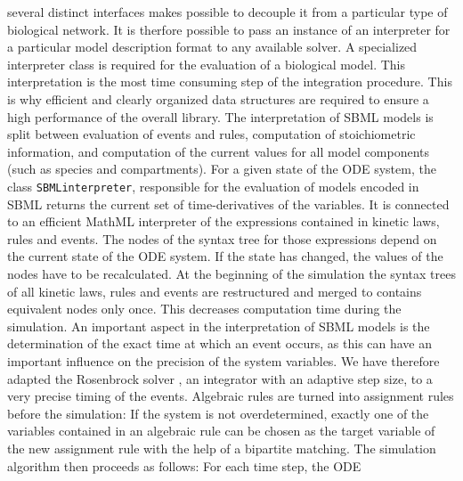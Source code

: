 \documentclass{bioinfo}
\newcommand{\SBMLinterpreter}{\texttt{SBML\-interpreter}}
\begin{document}
\begin{methods}
several distinct interfaces makes possible to decouple it from a particular type
of biological network. It is therfore possible to pass an instance of an
interpreter for a particular model description format to any
available solver.
%
A specialized interpreter class is required for the evaluation of a biological
model. This interpretation is the most time consuming step of the integration procedure.
This is why efficient and clearly organized data structures are required to
ensure a high performance of the overall library. The interpretation of SBML
models is split between evaluation of events and rules, computation of
stoichiometric information, and computation of the current values for all model
components (such as species and compartments).
%
For a given state of the ODE system, the class \SBMLinterpreter, responsible
for the evaluation of models encoded in SBML returns the current set of
time-derivatives of the variables.
It is connected to an efficient MathML interpreter of the expressions contained
in kinetic laws, rules and events. The nodes of the syntax tree for those
expressions depend on the current state of the ODE system. If the state has
changed, the values of the nodes have to be recalculated.
At the beginning of the simulation the syntax trees of all kinetic laws, rules
and events are restructured and merged to contains
equivalent nodes only once. This decreases computation time during
the simulation.
%
An important aspect in the interpretation of SBML models is the
determination of the exact time at which an event occurs, as this can have an
important influence on the precision of the system variables. We have
therefore adapted the Rosenbrock solver \citep{Kotcon2011}, an
integrator with an adaptive step size, to a very precise timing of the events.
%
Algebraic rules are turned into assignment rules before the
simulation: If the system is not overdetermined, exactly one of the variables
contained in an algebraic rule can be chosen as the target variable of the
new assignment rule with the help of a bipartite matching.
%
The simulation algorithm then proceeds as follows: For each time step, the ODE

\end{methods}
\end{document}
